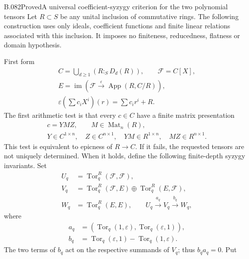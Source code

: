 \begin{saresult}{B.082}{Proved}{A universal coefficient-syzygy criterion for the two polynomial tensors}
Let $R\subset S$ be any unital inclusion of commutative rings. The
following construction uses only ideals, coefficient functions and
finite linear relations associated with this inclusion. It imposes
no finiteness, reducedness, flatness or domain hypothesis.

First form
\[
\begin{gathered}
 C=\bigcup_{d\ge1}(R:_S D_d(R)),\qquad \mathcal F=C[X],\\
 E=\operatorname{im}\left(\mathcal F\xrightarrow{\varepsilon}
                       \operatorname{App}(R,C/R)\right),\\
 \varepsilon\left(\sum c_iX^i\right)(r)=\sum c_ir^i+R.
\end{gathered}
                                                        \tag{B82.1}
\]
The first arithmetic test is that every $c\in C$ have a finite
matrix presentation
\[
\begin{gathered}
 c=Y M Z,\qquad M\in\operatorname{Mat}_{n}(R),\\
 Y\in C^{1\times n},\quad Z\in C^{n\times1},\quad
 YM\in R^{1\times n},\quad MZ\in R^{n\times1}.
\end{gathered}                                           \tag{B82.2}
\]
This test is equivalent to epicness of $R\to C$.
If it fails, the requested tensors are not uniquely determined.
When it holds, define the following finite-depth syzygy invariants.
Set
\[
\begin{aligned}
 U_q&=\operatorname{Tor}_q^R(\mathcal F,\mathcal F),\\
 V_q&=\operatorname{Tor}_q^R(\mathcal F,E)
                    \oplus\operatorname{Tor}_q^R(E,\mathcal F),\\
 W_q&=\operatorname{Tor}_q^R(E,E),\qquad
 U_q\xrightarrow{a_q}V_q\xrightarrow{b_q}W_q,
\end{aligned}                                           \tag{B82.3}
\]
where
\[
\begin{aligned}
 a_q&=(\operatorname{Tor}_q(1,\varepsilon),
                         \operatorname{Tor}_q(\varepsilon,1)),\\
 b_q&=\operatorname{Tor}_q(\varepsilon,1)
                        -\operatorname{Tor}_q(1,\varepsilon).
\end{aligned}
                                                        \tag{B82.4}
\]
The two terms of $b_q$ act on the respective summands of $V_q$;
thus $b_qa_q=0$. Put

\end{saresult}
